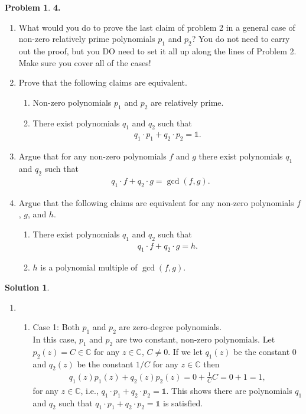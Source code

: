 \documentclass{article}
\theoremstyle{definition}
\newtheorem*{prob*}{Problem}
\newtheorem*{sln*}{Solution}
\begin{document}
\begin{prob*}\textbf{4.}\\
	\begin{enumerate}
		\item What would you do to prove the last claim of problem 2 in a general case of non-zero relatively prime polynomials $p_1$ and $p_2$? You do not need to carry out the proof, but you DO need to set it all up along the lines of Problem 2. Make sure you cover all of the cases!
		\item Prove that the following claims are equivalent.
		\begin{enumerate}
			\item Non-zero polynomials $p_1$ and $p_2$ are relatively prime.
			\item There exist polynomials $q_1$ and $q_2$ such that
			\begin{align*}
			q_1 \cdot p_1 +q_2 \cdot p_2 = \mathbb{1}.
			\end{align*}
		\end{enumerate}
	\item Argue that for any non-zero polynomials $f$ and $g$ there exist polynomials $q_1$ and $q_2$ such that
	\begin{align*}
	q_1 \cdot f + q_2 \cdot g = \gcd(f,g).
	\end{align*}
	\item Argue that the following claims are equivalent for any non-zero polynomials $f$, $g$, and $h$.
	\begin{enumerate}
		\item There exist polynomials $q_1$ and $q_2$ such that
		\begin{align*}
		q_1 \cdot f + q_2 \cdot g= h.
		\end{align*}
		\item $h$ is a polynomial multiple of $\gcd(f,g)$. 
	\end{enumerate}
	\end{enumerate}




\begin{sln*}
	$\,$
	\begin{enumerate}
	\item 
	\begin{enumerate}
		\item Case 1: Both $p_1$ and $p_2$ are zero-degree polynomials.\\
		
		In this case, $p_1$ and $p_2$ are two constant, non-zero polynomials. Let $p_2(z) = C \in \mathbb{C}$ for any $z\in \mathbb{C}$, $C\neq 0$. If we let $q_1(z)$ be the constant $0$ and $q_2(z)$ be the constant $1/C$ for any $z\in \mathbb{C}$ then
		\begin{align*}
		q_1(z) p_1(z) + q_2(z)p_2(z) = 0 + \frac{1}{C}C = 0 + 1 = 1,
		\end{align*}
		for any $z\in \mathbb{C}$, i.e., $q_1\cdot p_1 + q_2 \cdot p_2 = \mathbb{1}$. This shows there are polynomials $q_1$ and $q_2$ such that $q_1 \cdot p_1 + q_2 \cdot p_2 = \mathbb{1}$ is satisfied.\\
		

\end{enumerate}
\end{enumerate}
\end{sln*}
\end{prob*}
\end{document}
